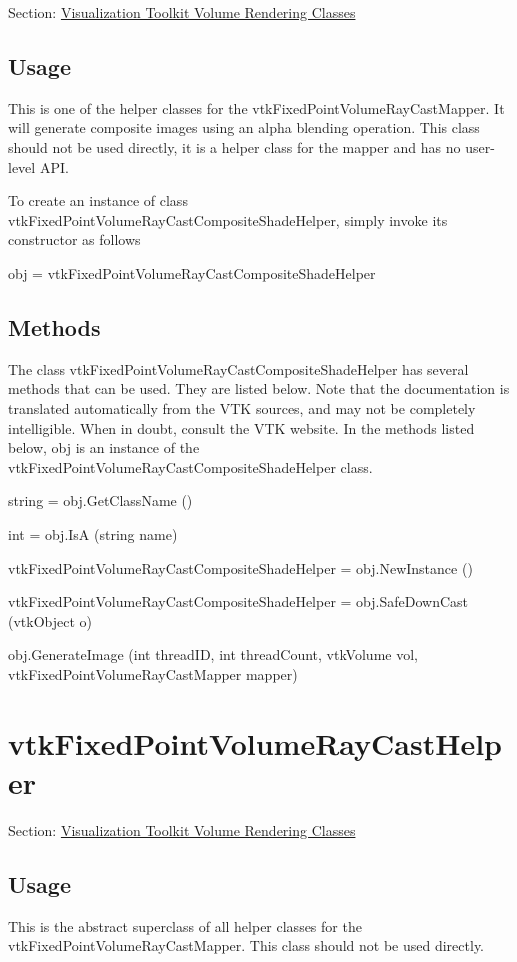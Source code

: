 Section\-: \hyperlink{sec_vtkvolumerendering}{Visualization Toolkit Volume Rendering Classes} \hypertarget{vtkwidgets_vtkxyplotwidget_Usage}{}\subsection{Usage}\label{vtkwidgets_vtkxyplotwidget_Usage}
This is one of the helper classes for the vtk\-Fixed\-Point\-Volume\-Ray\-Cast\-Mapper. It will generate composite images using an alpha blending operation. This class should not be used directly, it is a helper class for the mapper and has no user-\/level A\-P\-I.

To create an instance of class vtk\-Fixed\-Point\-Volume\-Ray\-Cast\-Composite\-Shade\-Helper, simply invoke its constructor as follows \begin{DoxyVerb}  obj = vtkFixedPointVolumeRayCastCompositeShadeHelper
\end{DoxyVerb}
 \hypertarget{vtkwidgets_vtkxyplotwidget_Methods}{}\subsection{Methods}\label{vtkwidgets_vtkxyplotwidget_Methods}
The class vtk\-Fixed\-Point\-Volume\-Ray\-Cast\-Composite\-Shade\-Helper has several methods that can be used. They are listed below. Note that the documentation is translated automatically from the V\-T\-K sources, and may not be completely intelligible. When in doubt, consult the V\-T\-K website. In the methods listed below, {\ttfamily obj} is an instance of the vtk\-Fixed\-Point\-Volume\-Ray\-Cast\-Composite\-Shade\-Helper class. 
\begin{DoxyItemize}
\item {\ttfamily string = obj.\-Get\-Class\-Name ()}  
\item {\ttfamily int = obj.\-Is\-A (string name)}  
\item {\ttfamily vtk\-Fixed\-Point\-Volume\-Ray\-Cast\-Composite\-Shade\-Helper = obj.\-New\-Instance ()}  
\item {\ttfamily vtk\-Fixed\-Point\-Volume\-Ray\-Cast\-Composite\-Shade\-Helper = obj.\-Safe\-Down\-Cast (vtk\-Object o)}  
\item {\ttfamily obj.\-Generate\-Image (int thread\-I\-D, int thread\-Count, vtk\-Volume vol, vtk\-Fixed\-Point\-Volume\-Ray\-Cast\-Mapper mapper)}  
\end{DoxyItemize}\hypertarget{vtkvolumerendering_vtkfixedpointvolumeraycasthelper}{}\section{vtk\-Fixed\-Point\-Volume\-Ray\-Cast\-Helper}\label{vtkvolumerendering_vtkfixedpointvolumeraycasthelper}
Section\-: \hyperlink{sec_vtkvolumerendering}{Visualization Toolkit Volume Rendering Classes} \hypertarget{vtkwidgets_vtkxyplotwidget_Usage}{}\subsection{Usage}\label{vtkwidgets_vtkxyplotwidget_Usage}
This is the abstract superclass of all helper classes for the vtk\-Fixed\-Point\-Volume\-Ray\-Cast\-Mapper. This class should not be used directly.

